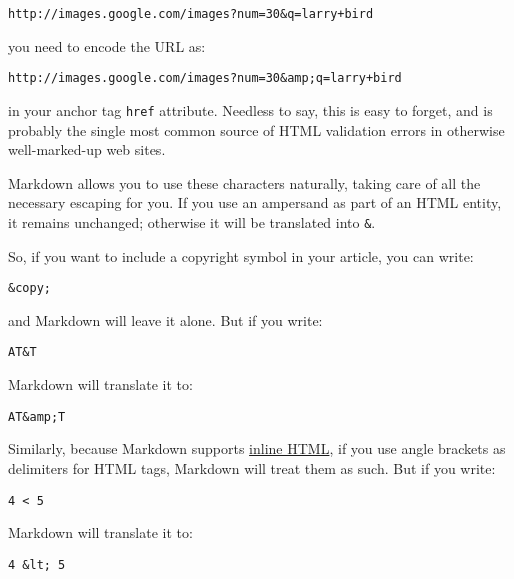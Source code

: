 \begin{lstlisting}
http://images.google.com/images?num=30&q=larry+bird
\end{lstlisting}




you need to encode the URL as:

\begin{lstlisting}
http://images.google.com/images?num=30&amp;q=larry+bird
\end{lstlisting}




in your anchor tag \texttt{href} attribute. Needless to say, this is easy to
forget, and is probably the single most common source of HTML validation
errors in otherwise well-marked-up web sites.



Markdown allows you to use these characters naturally, taking care of
all the necessary escaping for you. If you use an ampersand as part of
an HTML entity, it remains unchanged; otherwise it will be translated
into \texttt{\&}.



So, if you want to include a copyright symbol in your article, you can write:

\begin{lstlisting}
&copy;
\end{lstlisting}




and Markdown will leave it alone. But if you write:

\begin{lstlisting}
AT&T
\end{lstlisting}




Markdown will translate it to:

\begin{lstlisting}
AT&amp;T
\end{lstlisting}




Similarly, because Markdown supports \href{\#html}{inline HTML}, if you use
angle brackets as delimiters for HTML tags, Markdown will treat them as
such. But if you write:

\begin{lstlisting}
4 < 5
\end{lstlisting}




Markdown will translate it to:

\begin{lstlisting}
4 &lt; 5
\end{lstlisting}




